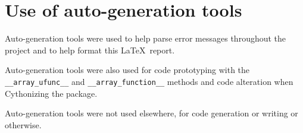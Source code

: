 \documentclass[11pt,a4paper]{article}
\begin{document}
\section{Use of auto-generation tools}
Auto-generation tools were used to help parse error messages throughout the project and to help format this \LaTeX\ report.

Auto-generation tools were also used for code prototyping with the \texttt{\_\_array\_ufunc\_\_} and \texttt{\_\_array\_function\_\_} methods and code alteration when Cythonizing the package.

Auto-generation tools were not used elsewhere, for code generation or writing or otherwise.
\end{document}
